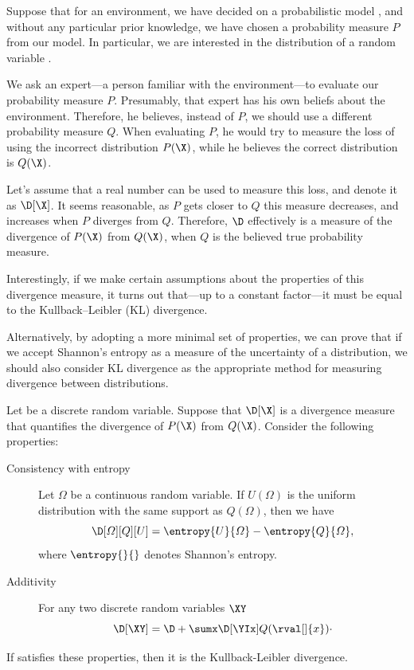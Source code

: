 Suppose that for an environment, we have decided on a probabilistic model \M, and without any particular prior
knowledge, we have chosen a probability measure $P$ from our model.
In particular, we are interested in the distribution of a random variable \X.

We ask an expert---a person familiar with the environment---to evaluate our probability measure $P$.
Presumably, that expert has his own beliefs about the environment.
Therefore, he believes, instead of $P$, we should use a different probability measure $Q$.
When evaluating $P$, he would try to measure the loss of using the incorrect distribution $P(\X)$,
while he believes the correct distribution is $Q(\X)$.

Let's assume that a real number can be used to measure this loss, and denote it as $\D[\X]$.
It seems reasonable, as $P$ gets closer to $Q$ this measure decreases, and increases when $P$ diverges from $Q$.
Therefore, $\D$ effectively is a measure of the divergence of $P(\X)$ from $Q(\X)$, when $Q$ is
the believed true probability measure.

Interestingly, if we make certain assumptions about the properties of this divergence measure,
it turns out that---up to a constant factor---it must be equal to the Kullback–Leibler (KL) divergence.

Alternatively, by adopting a more minimal set of properties, we can prove that if we accept Shannon’s entropy as a
measure of the uncertainty of a distribution, we should also consider KL divergence as the appropriate method for
measuring divergence between distributions.

\begin{theorem}
    Let \X be a discrete random variable.
    Suppose that $\D[\X]$ is a divergence measure that quantifies the divergence of $P(\X)$ from $Q(\X)$.
    Consider the following properties:
    \begin{description}
        \item[Consistency with entropy] Let $\varOmega$ be a continuous random variable. If $U(\varOmega)$ is the
        uniform distribution
        with the same support as $Q(\varOmega)$, then we have
        \[
            \D[\varOmega][Q][U] = \entropy{U}{\varOmega} - \entropy{Q}{\varOmega},
        \]
        where $\entropy{}{}$ denotes Shannon's entropy.
        \item[Additivity] For any two discrete random variables $\XY$
        \[
            \D[\XY] = \D + \sumx \D[\YIx]Q(\rval[]{x})\cdot
        \]
    \end{description}
    If  satisfies these properties, then it is the Kullback-Leibler divergence.
\end{theorem}

